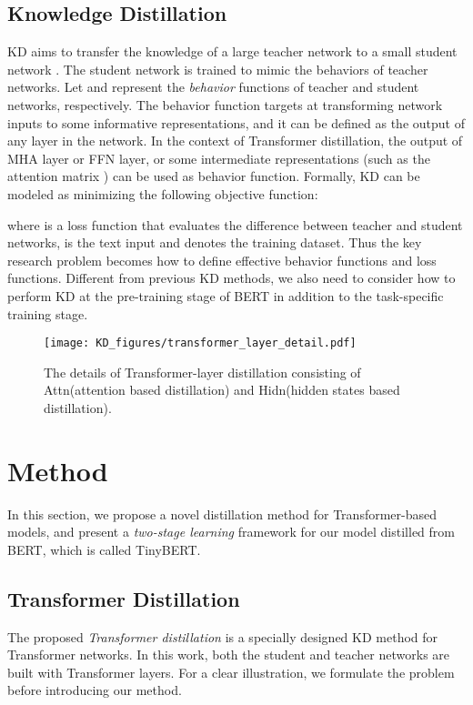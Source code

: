 \documentclass[11pt,a4paper]{article}
\begin{document}
\subsection{Knowledge Distillation}
KD aims to transfer the knowledge of a large teacher network  to a small student network . The student network is trained to mimic the behaviors of teacher networks. Let  and  represent the {\it behavior} functions of teacher and student networks, respectively. The behavior function targets at transforming network inputs to some informative representations, and it can be defined as the output of any layer in the network. In the context of Transformer distillation, the output of MHA layer or FFN layer, or some intermediate representations (such as the attention matrix ) can be used as behavior function. Formally, KD can be modeled as minimizing the following objective function:

where  is a loss function that evaluates the difference between teacher and student networks,  is the text input and  denotes the training dataset. Thus the key research problem becomes how to define effective behavior functions and loss functions. Different from previous KD methods, we also need to consider how to perform KD at the pre-training stage of BERT in addition to the task-specific training stage.
\begin{figure}
  \centering
  \texttt{[image: KD\_figures/transformer\_layer\_detail.pdf]}
  \caption{The details of Transformer-layer distillation consisting of Attn({attention based distillation}) and Hidn({hidden states based distillation}). }
  \label{figure:different_knowledge}
\end{figure}

\section{Method}\label{sec:method}
In this section, we propose a novel distillation method for Transformer-based models, and present a {\it two-stage learning} framework for our model distilled from BERT, which is called TinyBERT.

\subsection{Transformer Distillation}
The proposed {\it Transformer distillation} is a specially designed KD method for Transformer networks. In this work, both the student and teacher networks are built with Transformer layers. For a clear illustration, we formulate the problem before introducing our method.
\end{document}
